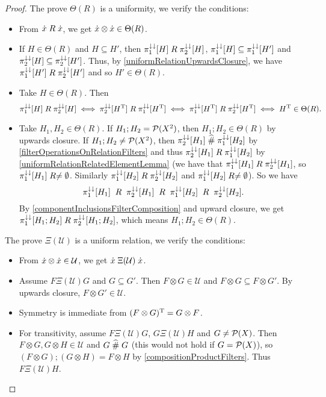 \begin{proof}
The prove $\Theta(R)$ is a uniformity, we verify the conditions:
\begin{itemize}
\item From $\dot{x}\mathrel{R}\dot{x}$, we get $\dot{x}\otimes \dot{x}\in\Theta(R)$.
\item If $H\in\Theta(R)$ and $H\subseteq H'$, then $\pi_1^{\downarrow\downarrow}[H]\mathrel{R} \pi_2^{\downarrow\downarrow}[H]$, $\pi_1^{\downarrow\downarrow}[H]\subseteq \pi_1^{\downarrow\downarrow}[H']$ and $\pi_2^{\downarrow\downarrow}[H]\subseteq \pi_2^{\downarrow\downarrow}[H']$. Thus, by \ref{uniformRelationUpwardsClosure}, we have $\pi_1^{\downarrow\downarrow}[H']\mathrel{R} \pi_2^{\downarrow\downarrow}[H']$ and so $H'\in\Theta(R)$.
\item Take $H\in \Theta(R)$. Then
\[ \pi_1^{\downarrow\downarrow}[H]\mathrel{R} \pi_2^{\downarrow\downarrow}[H] \iff \pi_2^{\downarrow\downarrow}[H^{\mathrm{T}}]\mathrel{R} \pi_1^{\downarrow\downarrow}[H^{\mathrm{T}}] \iff \pi_1^{\downarrow\downarrow}[H^{\mathrm{T}}]\mathrel{R} \pi_2^{\downarrow\downarrow}[H^{\mathrm{T}}] \iff H^{\mathrm{T}}\in \Theta(R). \]
\item Take $H_1, H_2\in \Theta(R)$. If $H_1;H_2 = \operatorname{\mathcal{P}}(X^2)$, then $H_1;H_2\in\Theta(R)$ by upwards closure. If $H_1;H_2 \neq \operatorname{\mathcal{P}}(X^2)$, then $\pi_2^{\downarrow\downarrow}[H_1]\mathrel{\widehat{\#}} \pi_1^{\downarrow\downarrow}[H_2]$ by \ref{filterOperationsOnRelationFilters} and thus $\pi_2^{\downarrow\downarrow}[H_1]\mathrel{R} \pi_1^{\downarrow\downarrow}[H_2]$ by \ref{uniformRelationRelatedElementLemma} (we have that $\pi_1^{\downarrow\downarrow}[H_1]\mathrel{R}\pi_2^{\downarrow\downarrow}[H_1]$, so $\pi_1^{\downarrow\downarrow}[H_1]\mathrel{R}\neq \emptyset$. Similarly $\pi_1^{\downarrow\downarrow}[H_2]\mathrel{R}\pi_2^{\downarrow\downarrow}[H_2]$ and $\pi_1^{\downarrow\downarrow}[H_2]\mathrel{R}\neq \emptyset$). So we have
\[ \pi_1^{\downarrow\downarrow}[H_1]\;\mathrel{R} \;\pi_2^{\downarrow\downarrow}[H_1] \;\mathrel{R} \;\pi_1^{\downarrow\downarrow}[H_2]\; \mathrel{R} \;\pi_2^{\downarrow\downarrow}[H_2]. \]
By \ref{componentInclusionsFilterComposition} and upward closure, we get $\pi_1^{\downarrow\downarrow}[H_1;H_2]\mathrel{R}\pi_2^{\downarrow\downarrow}[H_1;H_2]$, which means $H_1;H_2\in \Theta(R)$.
\end{itemize}

The prove $\Xi(\mathcal{U})$ is a uniform relation, we verify the conditions:
\begin{itemize}
\item From $\dot{x}\otimes \dot{x}\in\mathcal{U}$, we get $\dot{x}\mathrel{\Xi(\mathcal{U})}\dot{x}$.
\item Assume $F\mathrel{\Xi(\mathcal{U})}G$ and $G\subseteq G'$. Then $F\otimes G\in \mathcal{U}$ and $F\otimes G\subseteq F\otimes G'$. By upwards closure, $F\otimes G'\in\mathcal{U}$.
\item Symmetry is immediate from $(F\otimes G)^{\mathrm{T}} = G\otimes F$.
\item For transitivity, assume $F\mathrel{\Xi(\mathcal{U})}G$, $G\mathrel{\Xi(\mathcal{U})}H$ and $G \neq \operatorname{\mathcal{P}}(X)$. Then $F\otimes G, G\otimes H\in\mathcal{U}$ and $G \mathrel{\widehat{\#}} G$ (this would not hold if $G = \operatorname{\mathcal{P}}(X)$), so $(F\otimes G);(G\otimes H) = F\otimes H$ by \ref{compositionProductFilters}. Thus $F\mathrel{\Xi(\mathcal{U})}H$.
\end{itemize}


\end{proof}
